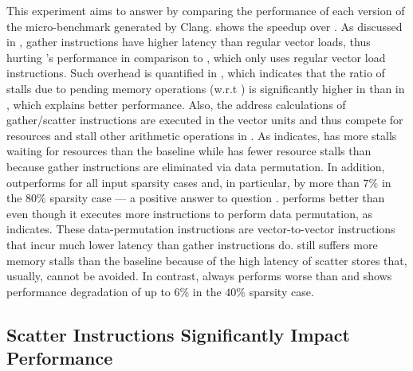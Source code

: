 This experiment aims to answer  by comparing the performance of each version of the \ifElseBench micro-benchmark generated by Clang.
 shows the speedup over \ifconv.
As discussed in , gather instructions have higher latency than regular vector loads, thus hurting \ALC's performance in comparison to \ifconv, which only uses regular vector load instructions.
Such overhead is quantified in , which indicates that the ratio of stalls due to pending memory operations (w.r.t \ifconv) is significantly higher in \ALC than in \ALCdp, which explains \ALCdp better performance.
Also, the address calculations of gather/scatter instructions are executed in the vector units and thus compete for resources and stall other arithmetic operations in \ifElseBench.
As  indicates, \ALC has more stalls waiting for resources than the baseline \ifconv while \ALCdp has fewer resource stalls than \ALC because gather instructions are eliminated via data permutation.
In addition, \ALCdp outperforms \ifconv for all input sparsity cases and, in particular, by more than $7\%$ in the $80\%$ sparsity case --- a positive answer to question .
\ALCdp performs better than \ifconv even though it executes more instructions to perform data permutation,  as  indicates.
These data-permutation instructions are vector-to-vector instructions that incur much lower latency than gather instructions do.
\ALCdp still suffers more memory stalls than the baseline \ifconv because of the high latency of scatter stores that, usually, cannot be avoided.
In contrast,  \ALC always performs worse than \ifconv and shows performance degradation of up to $6\%$ in the $40\%$ sparsity case.

\subsection{Scatter Instructions Significantly Impact Performance}
\label{sec:eval-scatters-costs}

